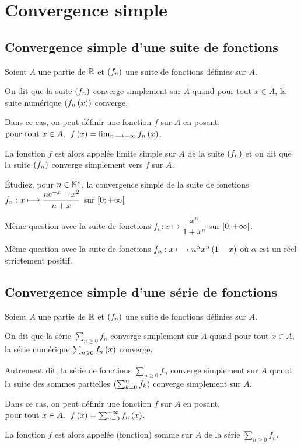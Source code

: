 \section{Convergence simple}

\subsection{Convergence simple d'une suite de fonctions}

\begin{defi}
Soient \(A\) une partie de \(\mathbb{R}\) et \(\left(f_n\right)\) une suite de fonctions définies sur \(A\).

On dit que la suite \(\left(f_n\right)\) converge simplement sur \(A\) quand pour tout \(x\in A\), la suite numérique \(\left(f_n\left(x\right)\right)\) converge.

Dans ce cas, on peut définir une fonction \(f\) sur \(A\) en posant, \(\quantifs{\tpt x\in A}f\paren{x}=\lim_{n\to\pinf}f_n\paren{x}\).

La fonction \(f\) est alors appelée limite simple sur \(A\) de la suite \(\left(f_n\right)\) et on dit que la suite \(\left(f_n\right)\) converge simplement vers \(f\) sur \(A\).
\end{defi}

\begin{exo}
Étudiez, pour \(n\in\mathbb{N}^*\), la convergence simple de la suite de fonctions \(f_n:x\longmapsto\dfrac{n\mathrm{e}^{-x}+x^2}{n+x}\) sur \(\left[0;+\infty\right[\)
\end{exo}

\begin{exo}
Même question avec la suite de fonctions \(f_n:x\mapsto\dfrac{x^n}{1+x^n}\) sur \(\left[0;+\infty\right[\).
\end{exo}

\begin{exo}
Même question avec la suite de fonctions \(f_n:x\longmapsto n^\alpha x^n\left(1-x\right)\) où \(\alpha\) est un réel strictement positif.
\end{exo}

\subsection{Convergence simple d'une série de fonctions}

\begin{defi}
Soient \(A\) une partie de \(\mathbb{R}\) et \(\left(f_n\right)\) une suite de fonctions définies sur \(A\).

On dit que la série \(\sum_{n\geq0}f_n\) converge simplement sur \(A\) quand pour tout \(x\in A\), la série numérique \(\sum_{n\geqslant0}f_n\left(x\right)\) converge.

Autrement dit, la série de fonctions \(\sum_{n\geq0}f_n\) converge simplement sur \(A\) quand la suite des sommes partielles \(\left(\sum_{k=0}^nf_k\right)\) converge simplement sur \(A\).

Dans ce cas, on peut définir une fonction \(f\) sur \(A\) en posant, \(\quantifs{\tpt x\in A}f\paren{x}=\sum_{n=0}^{\pinf}f_n\paren{x}\).

La fonction \(f\) est alors appelée (fonction) somme sur \(A\) de la série \(\sum_{n\geq0}f_n\).
\end{defi}

